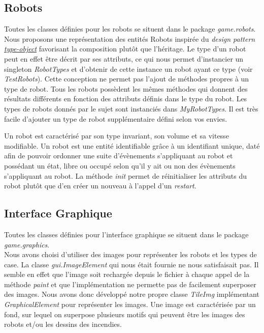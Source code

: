 \documentclass[a4paper, 10pt, french]{article}
\begin{document}
	\subsection{Robots}
	\noindent Toutes les classes définies pour les robots se situent dans le package {\it game.robots}. \\

	Nous proposons une représentation des entités Robots inspirée du {\it design pattern \href{https://gameprogrammingpatterns.com/type-object.html}{type-object}} favorisant la composition plutôt que l'héritage. Le type d'un robot peut en effet être décrit par ses attributs, ce qui nous permet d'instancier un singleton {\it RobotTypes} et d'obtenir de cette instance un robot ayant ce type (voir {\it TestRobots}). Cette conception ne permet pas l'ajout de méthodes propres à un type de robot. Tous les robots possèdent les mêmes méthodes qui donnent des résultats différents en fonction des attributs définis dans le type du robot. Les types de robots donnés par le sujet sont instanciés dans {\it MyRobotTypes}. Il est très facile d'ajouter un type de robot supplémentaire défini selon vos envies.
	\par\leavevmode\par
	Un robot est caractérisé par son type invariant, son volume et sa vitesse modifiable. Un robot est une entité identifiable grâce à un identifiant unique, daté afin de pouvoir ordonner une suite d'évènements s'appliquant au robot et possédant un état, libre ou occupé selon qu'il y ait ou non des évènements s'appliquant au robot. La méthode {\it init} permet de réinitialiser les attributs du robot plutôt que d'en créer un nouveau à l'appel d'un {\it restart}.

	\subsection{Interface Graphique}
	\noindent Toutes les classes définies pour l'interface graphique se situent dans le package {\it game.graphics}. \\

	Nous avons choisi d'utiliser des images pour représenter les robots et les types de case. La classe {\it gui.ImageElement} qui nous était fournie ne nous satisfaisait pas. Il semble en effet que l'image soit rechargée depuis le fichier à chaque appel de la méthode {\it paint} et que l'implémentation ne permette pas de facilement superposer des images. Nous avons donc développé notre propre classe {\it TileImg} implémentant {\it GraphicalElement} pour représenter les images. Une image est caractérisée par un fond, sur lequel on superpose plusieurs motifs qui peuvent être les images des robots et/ou les dessins des incendies. \\
	
\end{document}
